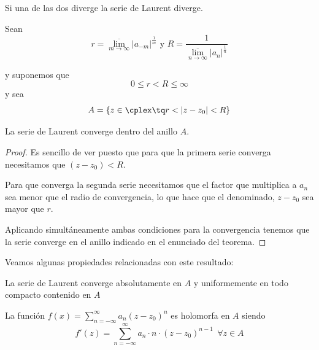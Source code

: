 \documentclass{apuntes}
\begin{document}
\obs Si una de las dos diverge la serie de Laurent diverge.

\begin{theorem}
Sean
\[r = \overline{\lim_{m \to \infty}}|a_{-m}|^\frac{1}{m} \text{ y } R = \frac{1}{\overline{\lim_{n \to \infty}}|a_{n}|^\frac{1}{n}}\]

y suponemos que
\[0 \leq r < R \leq \infty\]
y sea
\[A = \{z \in \cplex \tq r < |z-z_0|<R\}\]

La serie de Laurent converge dentro del anillo $A$.
\end{theorem}
\begin{proof}
Es sencillo de ver puesto que para que la primera serie converga necesitamos que $(z-z_0)< R$.

Para que converga la segunda serie necesitamos que el factor que multiplica a $a_n$ sea menor que el radio de convergencia, lo que hace que el denominado, $z-z_0$ sea mayor que $r$.

Aplicando simultáneamente ambas condiciones para la convergencia tenemos que la serie converge en el anillo indicado en el enunciado del teorema.
\end{proof}

Veamos algunas propiedades relacionadas con este resultado:
\begin{prop}
\item La serie de Laurent converge absolutamente en $A$ y uniformemente en todo compacto contenido en $A$
\item La función $f(x)=\sum_{n=-\infty}^{\infty}a_n(z-z_0)^n$ es holomorfa en $A$ siendo
\[f'(z)=\sum_{n=-\infty}^{\infty}a_n\cdot n \cdot (z-z_0)^{n-1} \ \ \forall z \in A\]
\end{prop}
\end{document}
